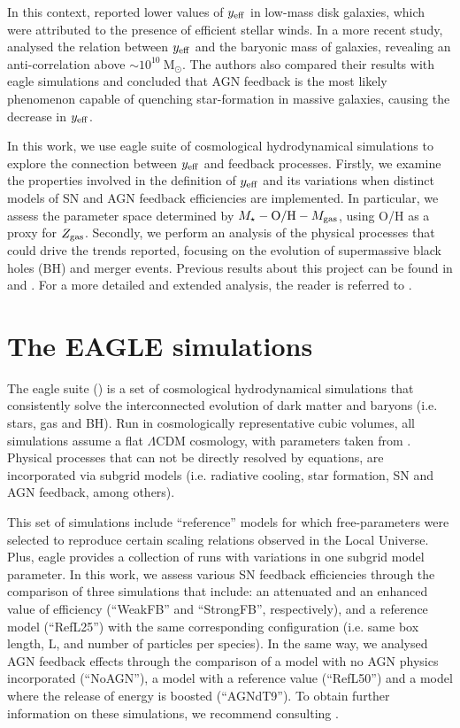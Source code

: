\documentclass[baaa]{baaa}
\begin{document}
In this context, \citet[][]{Tremonti2004} reported lower values of $y_{\rm eff}$ in low-mass disk galaxies, which were attributed to the presence of efficient stellar winds. In a more recent study, \citet[][]{Lara-Lopez2019} analysed the relation between $y_{\rm eff}$ and the baryonic mass of galaxies, revealing an anti-correlation above $\sim 10^{10}~\mathrm{M}_\odot$. The authors also compared their results with {\sc eagle} simulations and concluded that AGN feedback is the most likely phenomenon capable of quenching star-formation in massive galaxies, causing the decrease in $y_{\rm eff}$.

In this work, we use {\sc eagle} suite of cosmological hydrodynamical simulations to explore the connection between $y_{\rm eff}$ and feedback processes. Firstly, we examine the properties involved in the definition of $y_{\rm eff}$ and its variations when distinct models of SN and AGN feedback efficiencies are implemented. In particular, we assess the parameter space determined by $M_\star - {\rm O/H} - M_{\rm gas}$, using O/H as a proxy for $Z_{\rm gas}$.
Secondly, we perform an analysis of the physical processes that could drive the trends reported, focusing on the evolution of supermassive black holes (BH) and merger events. Previous results about this project can be found in \citet{Zerbo2022} and  \citet{Zerbo2023}. For a more detailed and extended analysis, the reader is referred to \citet{Zerbo2024}.

\section{The EAGLE simulations}
The {\sc eagle} suite (\citealt{Schaye2015, Crain2015, TheEAGLEteam2017}) is a set of cosmological hydrodynamical simulations that consistently solve the interconnected evolution of dark matter and baryons (i.e. stars, gas and BH). Run in cosmologically representative cubic volumes, all simulations assume a flat $\Lambda$CDM cosmology, with parameters taken from \cite{Planck2015}. Physical processes that can not be directly resolved by equations, are incorporated via subgrid models (i.e. radiative cooling, star formation, SN and AGN feedback, among others).

This set of simulations include ``reference'' models for which free-parameters were selected to reproduce certain scaling relations observed in the Local Universe. Plus, {\sc eagle} provides a collection of runs with variations in one subgrid model parameter. In this work, we assess various SN feedback efficiencies through the comparison of three simulations that include: an attenuated and an enhanced value of efficiency (``WeakFB'' and ``StrongFB'', respectively), and a reference model (``RefL25'') with the same corresponding configuration (i.e. same box length, L, and number of particles per species). In the same way, we analysed AGN feedback effects through the comparison of a model with no AGN physics incorporated (``NoAGN''), a model with a reference value (``RefL50'') and a model where the release of energy is boosted (``AGNdT9''). To obtain further information on these simulations, we recommend consulting \citet{Crain2015}.
\end{document}
